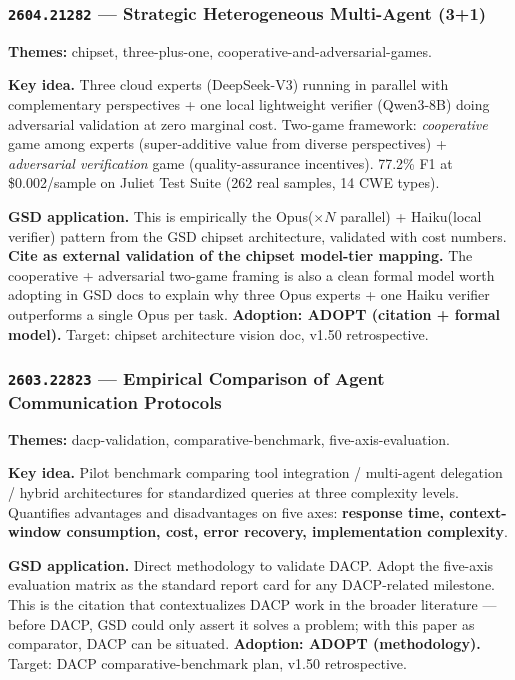 \documentclass[11pt,letterpaper]{article}
\newcommand{\arxivid}[1]{\texttt{\textcolor{accent}{#1}}}
\newcommand{\paperhead}[2]{\noindent\textbf{\sffamily\textcolor{secondary}{#1}} \textemdash{} #2}
\begin{document}
\subsubsection{\arxivid{2604.21282} --- Strategic Heterogeneous Multi-Agent (3+1)}

\paperhead{Themes:}{chipset, three-plus-one, cooperative-and-adversarial-games.}

\textbf{Key idea.} Three cloud experts (DeepSeek-V3) running in parallel with complementary perspectives + one local lightweight verifier (Qwen3-8B) doing adversarial validation at zero marginal cost. Two-game framework: \textit{cooperative} game among experts (super-additive value from diverse perspectives) + \textit{adversarial verification} game (quality-assurance incentives). 77.2\% F1 at \$0.002/sample on Juliet Test Suite (262 real samples, 14 CWE types).

\textbf{GSD application.} This is empirically the Opus(${\times}N$ parallel) + Haiku(local verifier) pattern from the GSD chipset architecture, validated with cost numbers. \textbf{Cite as external validation of the chipset model-tier mapping.} The cooperative + adversarial two-game framing is also a clean formal model worth adopting in GSD docs to explain why three Opus experts + one Haiku verifier outperforms a single Opus per task. \textbf{Adoption: ADOPT (citation + formal model).} Target: chipset architecture vision doc, v1.50 retrospective.

\subsubsection{\arxivid{2603.22823} --- Empirical Comparison of Agent Communication Protocols}

\paperhead{Themes:}{dacp-validation, comparative-benchmark, five-axis-evaluation.}

\textbf{Key idea.} Pilot benchmark comparing tool integration / multi-agent delegation / hybrid architectures for standardized queries at three complexity levels. Quantifies advantages and disadvantages on five axes: \textbf{response time, context-window consumption, cost, error recovery, implementation complexity}.

\textbf{GSD application.} Direct methodology to validate DACP. Adopt the five-axis evaluation matrix as the standard report card for any DACP-related milestone. This is the citation that contextualizes DACP work in the broader literature --- before DACP, GSD could only assert it solves a problem; with this paper as comparator, DACP can be situated. \textbf{Adoption: ADOPT (methodology).} Target: DACP comparative-benchmark plan, v1.50 retrospective.
\end{document}
